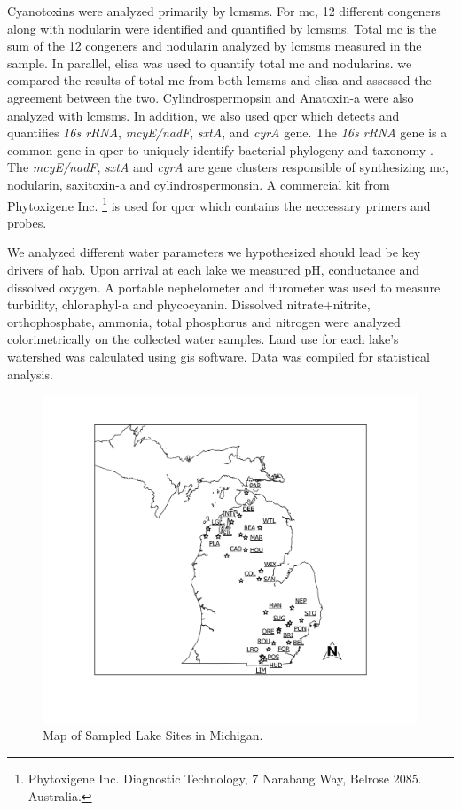 Cyanotoxins were analyzed primarily by \gls{lcmsms}. For \gls{mc}, 12 different congeners along with nodularin were identified and quantified by \gls{lcmsms}. Total \gls{mc} is the sum of the 12 congeners and nodularin analyzed by \gls{lcmsms} measured in the sample. In parallel, \gls{elisa} was used to quantify total \gls{mc} and nodularins.  we compared the results of total \gls{mc} from both \gls{lcmsms} and \gls{elisa} and assessed the agreement between the two. Cylindrospermopsin and Anatoxin-a were also analyzed with \gls{lcmsms}. In addition, we also used \gls{qpcr} which detects and quantifies \emph{16s rRNA}, \emph{mcyE/nadF}, \emph{sxtA}, and \emph{cyrA} gene. The \emph{16s rRNA} gene is a common gene in \gls{qpcr} to uniquely identify bacterial phylogeny and taxonomy \cite{janda_16s_2007}.  The \emph{mcyE/nadF}, \emph{sxtA} and \emph{cyrA} are gene clusters responsible of synthesizing \gls{mc}, nodularin, saxitoxin-a and cylindrospermonsin. A commercial kit from Phytoxigene Inc. \footnote{Phytoxigene Inc. Diagnostic Technology, 7 Narabang Way, Belrose 2085. Australia.} is used for \gls{qpcr} which contains the neccessary primers and probes.  

We analyzed different water parameters we hypothesized should lead be key drivers of \gls{hab}. Upon arrival at each lake we measured pH, conductance and dissolved oxygen. A portable nephelometer and flurometer was used to measure turbidity, chloraphyl-a and phycocyanin. Dissolved nitrate+nitrite, orthophosphate, ammonia, total phosphorus and nitrogen were analyzed colorimetrically on the collected water samples. Land use for each lake's watershed was calculated using \gls{gis} software. Data was compiled for statistical analysis.

\begin{figure}[!h]
\includegraphics[width=\textwidth]{figures/Overview}
\caption{Map of Sampled Lake Sites in Michigan.}
\label{fig:overview}
\end{figure}

